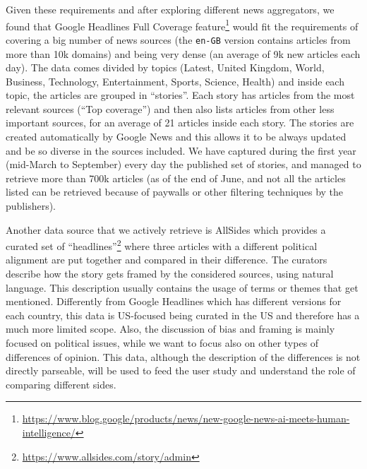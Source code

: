 Given these requirements and after exploring different news aggregators, we found that Google Headlines Full Coverage feature\footnote{\url{https://www.blog.google/products/news/new-google-news-ai-meets-human-intelligence/}} would fit the requirements of covering a big number of news sources (the \texttt{en-GB} version contains articles from more than 10k domains) and being very dense (an average of 9k new articles each day).
The data comes divided by topics (Latest, United Kingdom, World, Business, Technology, Entertainment, Sports, Science, Health) and inside each topic, the articles are grouped in ``stories''. Each story has articles from the most relevant sources (``Top coverage'') and then also lists articles from other less important sources, for an average of 21 articles inside each story.
The stories are created automatically by Google News and this allows it to be always updated and be so diverse in the sources included.
We have captured during the first year (mid-March to September) every day the published set of stories, and managed to retrieve more than 700k articles (as of the end of June, and not all the articles listed can be retrieved because of paywalls or other filtering techniques by the publishers).

Another data source that we actively retrieve is AllSides which provides a curated set of ``headlines''\footnote{\url{https://www.allsides.com/story/admin}} where three articles with a different political alignment are put together and compared in their difference.
The curators describe how the story gets framed by the considered sources, using natural language.
This description usually contains the usage of terms or themes that get mentioned.
Differently from Google Headlines which has different versions for each country, this data is US-focused being curated in the US and therefore has a much more limited scope. Also, the discussion of bias and framing is mainly focused on political issues, while we want to focus also on other types of differences of opinion.
This data, although the description of the differences is not directly parseable, will be used to feed the user study and understand the role of comparing different sides.

